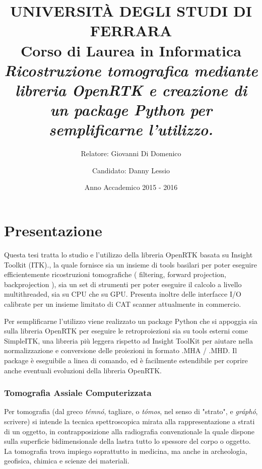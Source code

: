 \documentclass[a4paper,11pt, oneside]{article}
\title{\textbf{UNIVERSITÀ DEGLI STUDI DI FERRARA\\}
\bigskip
Corso di Laurea in Informatica\\
\bigskip
\bigskip
\bigskip
\textit{Ricostruzione tomografica mediante libreria OpenRTK e creazione di un package Python per semplificarne l'utilizzo.\\}
\bigskip
\bigskip
\bigskip
\bigskip
\bigskip
\bigskip
\bigskip
\bigskip
\bigskip
\bigskip
\bigskip
\bigskip
\bigskip
\bigskip
\bigskip
\bigskip
\bigskip
\bigskip
\bigskip
\bigskip
}
\author{Relatore: Giovanni Di Domenico\and
Candidato: Danny Lessio}
\date{Anno Accademico 2015 - 2016}
\begin{document}
    \maketitle
    \newpage
    
    \tableofcontents

    \part{Presentazione}
        \par
            Questa tesi tratta lo studio e l'utilizzo della libreria OpenRTK \cite{openrtk-website} basata su Insight Toolkit (ITK).\cite{itk-website}, la quale fornisce sia un insieme di tools basilari per poter eseguire efficientemente ricostruzioni tomografiche ( filtering, forward projection, backprojection ), sia un set di strumenti per poter eseguire il calcolo a livello multithreaded, sia su CPU che su GPU. Presenta inoltre delle interfacce I/O calibrate per un insieme limitato di CAT scanner attualmente in commercio.
    
        \par
            Per semplificarne l'utilizzo viene realizzato un package Python che si appoggia sia sulla libreria OpenRTK per eseguire le retroproiezioni sia su tools esterni come SimpleITK, una libreria più leggera rispetto ad Insight ToolKit per aiutare nella normalizzazione e conversione delle proiezioni in formato .MHA / .MHD.
            Il package è eseguibile a linea di comando, ed è facilmente estendibile per coprire anche eventuali evoluzioni della libreria OpenRTK.
    
        \par
            [TODO nella sezione X si fa Y etc bla di blabla, il secondo di blabla]
          
        \newpage
        \section{Tomografia Assiale Computerizzata}
            Per tomografia (dal greco \textit{témnó}, tagliare, o \textit{tómos}, nel senso di "strato", e \textit{gráphó}, scrivere) si intende la tecnica spettroscopica mirata alla rappresentazione a strati di un oggetto, in contrapposizione alla radiografia convenzionale la quale dispone sulla superficie bidimensionale della lastra tutto lo spessore del corpo o oggetto.\\
            La tomografia trova impiego soprattutto in medicina, ma anche in archeologia, geofisica, chimica e scienze dei materiali.
            
\end{document}

